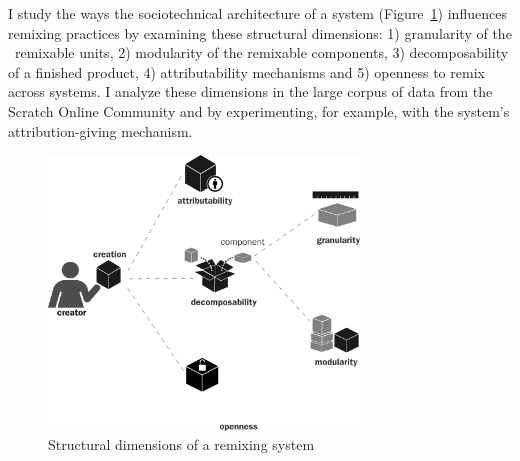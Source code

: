 I study the ways the sociotechnical architecture of a system (Figure~\ref{f:structure}) influences remixing practices by examining these structural dimensions:
1) granularity of the \ remixable units, 
2) modularity of the remixable components, 
3) decomposability of a finished product, 
4) attributability mechanisms and 
5) openness to remix across systems. 
I analyze these dimensions in the large corpus of data from the Scratch Online Community and by experimenting, for example, with the system's attribution-giving mechanism.

\begin{figure}
\centering
\includegraphics[width=3.25in]{figures/structure.pdf}
\caption{Structural dimensions of a remixing system}
\label{f:structure}
\end{figure}

